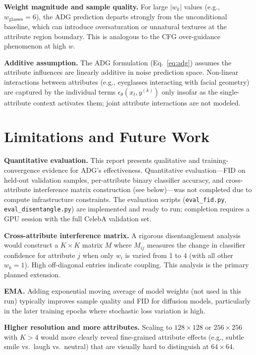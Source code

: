 \documentclass{article}
\begin{document}
\textbf{Weight magnitude and sample quality.} For large $|w_k|$ values (e.g., $w_{\text{glasses}}{=}6$), the ADG prediction departs strongly from the unconditional baseline, which can introduce oversaturation or unnatural textures at the attribute region boundary. This is analogous to the CFG over-guidance phenomenon at high $w$.

\textbf{Additive assumption.} The ADG formulation (Eq.~\eqref{eq:adg}) assumes the attribute influences are linearly additive in noise prediction space. Non-linear interactions between attributes (e.g., eyeglasses interacting with facial geometry) are captured by the individual terms $\epsilon_\theta(x_t, y^{(k)})$ only insofar as the single-attribute context activates them; joint attribute interactions are not modeled.

\section{Limitations and Future Work}
\label{sec:limitations}

\textbf{Quantitative evaluation.} This report presents qualitative and training-convergence evidence for ADG's effectiveness. Quantitative evaluation—FID on held-out validation samples, per-attribute binary classifier accuracy, and cross-attribute interference matrix construction (see below)—was not completed due to compute infrastructure constraints. The evaluation scripts (\texttt{eval\_fid.py}, \texttt{eval\_disentangle.py}) are implemented and ready to run; completion requires a GPU session with the full CelebA validation set.

\textbf{Cross-attribute interference matrix.} A rigorous disentanglement analysis would construct a $K{\times}K$ matrix $M$ where $M_{ij}$ measures the change in classifier confidence for attribute $j$ when only $w_i$ is varied from 1 to 4 (with all other $w_k{=}1$). High off-diagonal entries indicate coupling. This analysis is the primary planned extension.

\textbf{EMA.} Adding exponential moving average of model weights (not used in this run) typically improves sample quality and FID for diffusion models, particularly in the later training epochs where stochastic loss variation is high.

\textbf{Higher resolution and more attributes.} Scaling to $128{\times}128$ or $256{\times}256$ with $K > 4$ would more clearly reveal fine-grained attribute effects (e.g., subtle smile vs.\ laugh vs.\ neutral) that are visually hard to distinguish at $64{\times}64$.
\end{document}
